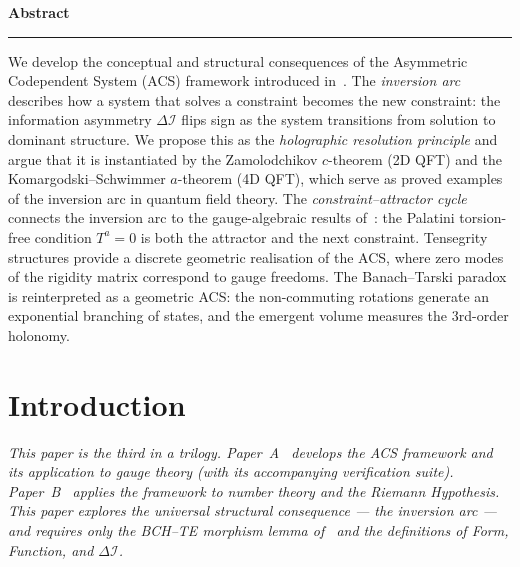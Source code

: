 \documentclass[11pt,a4paper]{article}
\theoremstyle{plain}
\theoremstyle{definition}
\theoremstyle{remark}
\newcommand{\DI}{\Delta\mathcal{I}}
\begin{document}
\begin{titlepage}
\begin{center}
\begin{minipage}{0.88\textwidth}
\begin{center}
  {\bfseries\color{acsprimary}\large Abstract}\\[0.3em]
  {\color{acsrule}\rule{1.2in}{0.3pt}}
\end{center}
\vspace{0.5em}
\small\noindent
We develop the conceptual and structural consequences of the Asymmetric
Codependent System (ACS) framework introduced in~\cite{Wallace2026a}.
The \emph{inversion arc} describes how a system that solves a constraint
becomes the new constraint: the information asymmetry $\DI$ flips sign as
the system transitions from solution to dominant structure.  We propose
this as the \emph{holographic resolution principle} and argue that it is
instantiated by the Zamolodchikov $c$-theorem (2D QFT) and the
Komargodski--Schwimmer $a$-theorem (4D QFT), which serve as proved
examples of the inversion arc in quantum field theory.  The
\emph{constraint--attractor cycle} connects the inversion arc to the
gauge-algebraic results of~\cite{Wallace2026a}: the Palatini torsion-free
condition $T^a = 0$ is both the attractor and the next constraint.
Tensegrity structures provide a discrete geometric realisation of the
ACS, where zero modes of the rigidity matrix correspond to gauge freedoms.
The Banach--Tarski paradox is reinterpreted as a geometric ACS: the
non-commuting rotations generate an exponential branching of states, and
the emergent volume measures the 3rd-order holonomy.
\end{minipage}
\end{center}

\vfill

\noindent{\color{acsrule}\rule{\textwidth}{0.4pt}}
\end{titlepage}

\clearpage
{}
\setcounter{page}{1}
\tableofcontents
\clearpage
{}
\setcounter{page}{1}

\section{Introduction}
\label{sec:intro}

\noindent\textit{This paper is the third in a trilogy.
Paper~A~\cite{Wallace2026a} develops the ACS framework and its
application to gauge theory (with its accompanying verification suite).
Paper~B~\cite{Wallace2026b} applies the framework to number theory
and the Riemann Hypothesis.  This paper explores the universal
structural consequence --- the inversion arc --- and requires only
the BCH--TE morphism lemma of~\cite{Wallace2026a} and the
definitions of Form, Function, and $\DI$.}
\end{document}
